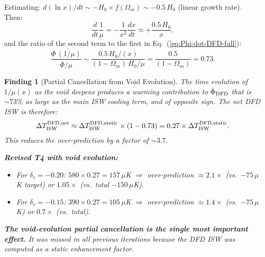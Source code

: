 \documentclass[11pt]{article}
\newtheorem{finding}{Finding}
\newcommand{\Hzero}{H_0}
\newcommand{\mufd}{\mu}
\begin{document}
Estimating: $d(\ln x)/dt \sim -H_0 \times f(\Omega_m) \sim -0.5\,\Hzero$
(linear growth rate). Then:
\begin{equation}
\frac{d}{dt}\frac{1}{\mufd} = -\frac{1}{x^2}\frac{dx}{dt}
\approx +\frac{0.5\,\Hzero}{x},
\end{equation}
and the ratio of the second term to the first in
Eq.~(\ref{eq:Phi-dot-DFD-full}):
\begin{equation}
\frac{\Phi\,\dot{(1/\mufd)}}{\dot{\Phi}/\mufd}
\sim \frac{0.5\,\Hzero/(x)}{(1-\Omega_m)\,\Hzero/\mufd}
= \frac{0.5}{(1-\Omega_m)} = 0.73.
\label{eq:second-term-ratio}
\end{equation}

\begin{finding}[Partial Cancellation from Void Evolution]
\label{find:void-evolution}
The time evolution of $1/\mufd(x)$ as the void deepens produces a
warming contribution to $\dot{\Phi}_{\rm DFD}$ that is $\sim 73\%$ as
large as the main ISW cooling term, and of \emph{opposite sign}.
The net DFD ISW is therefore:
\begin{equation}
\Delta T_{\rm ISW}^{\rm DFD,net}
\approx \Delta T_{\rm ISW}^{\rm DFD,static}\times(1 - 0.73)
= 0.27\times\Delta T_{\rm ISW}^{\rm DFD,static}.
\label{eq:cancellation}
\end{equation}
This reduces the over-prediction by a factor of $\sim 3.7$.

\textbf{Revised T4 with void evolution:}
\begin{itemize}[nosep]
\item For $\delta_v = -0.20$: $580\times 0.27 = 157\,\mu$K $\Rightarrow$
  over-prediction $\approx 2.1\times$ (vs.\ $-75\,\mu$K target) or
  $1.05\times$ (vs.\ total $-150\,\mu$K).
\item For $\delta_v = -0.15$: $390\times 0.27 = 105\,\mu$K $\Rightarrow$
  over-prediction $\approx 1.4\times$ (vs.\ $-75\,\mu$K) or $0.7\times$
  (vs.\ total).
\end{itemize}

\textbf{The void-evolution partial cancellation is the single most
important effect.} It was missed in all previous iterations because
the DFD ISW was computed as a static enhancement factor.
\end{finding}
\end{document}
